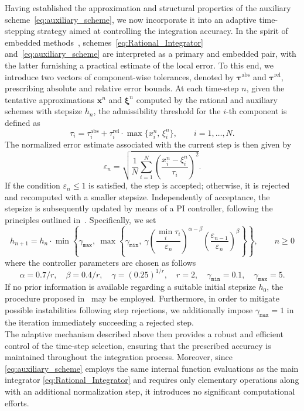 \documentclass[11pt,letterpaper]{article}
\theoremstyle{remark}
\begin{document}
Having established the approximation and structural properties of the auxiliary scheme~\eqref{eq:auxiliary_scheme}, we now incorporate it into an adaptive time-stepping strategy aimed at controlling the integration accuracy. In the spirit of embedded methods~\cite[Section~II.4]{Hairer}, schemes~\eqref{eq:Rational_Integrator} and~\eqref{eq:auxiliary_scheme} are interpreted as a primary and embedded pair, with the latter furnishing a practical estimate of the local error. To this end, we introduce two vectors of component-wise tolerances, denoted by $\bm{\tau}^{\text{abs}}$ and $\bm{\tau}^{\text{rel}}$, prescribing absolute and relative error bounds. At each time-step $n$, given the tentative approximations $\bm{x}^n$ and $\bm{\xi}^n$ computed by the rational and auxiliary schemes with stepsize $h_n$, the admissibility threshold for the $i$-th component is defined as
\begin{equation*}
    \tau_i = \tau_i^{\text{abs}} + \tau_i^{\text{rel}} \cdot \max\{ x_i^n, \, \xi_i^n \}, \qquad i = 1, \dots, N.
\end{equation*}
The normalized error estimate associated with the current step is then given by
\begin{equation*}
    \varepsilon_n = \sqrt{\frac{1}{N} \sum_{i=1}^N \left( \frac{x_i^n - \xi_i^n}{\tau_i} \right)^2 }.
\end{equation*}
If the condition $\varepsilon_n \leq 1$ is satisfied, the step is accepted; otherwise, it is rejected and recomputed with a smaller stepsize. Independently of acceptance, the stepsize is subsequently updated by means of a PI controller, following the principles outlined in~\cite[Section~IV.2]{Hairer_II}. Specifically, we set
\begin{equation}\label{eq:PI_Controller}
    h_{n+1} = h_n \cdot \min\left\{ \gamma_{\texttt{max}}, \ \max\left\{ \gamma_{\texttt{min}}, \ \gamma \left( \frac{\min_i \tau_i}{\varepsilon_n} \right)^{\alpha - \beta} \! \left( \frac{\varepsilon_{n-1}}{\varepsilon_n} \right)^{\beta} \right\} \right\}, \qquad n\geq 0
\end{equation}
where the controller parameters are chosen as follows
\begin{equation*}
    \alpha = 0.7/r, \quad \beta = 0.4/r, \quad \gamma = (0.25)^{1/r}, \quad r = 2, \quad \gamma_{\texttt{min}} = 0.1, \quad \gamma_{\texttt{max}} = 5.
\end{equation*}
If no prior information is available regarding a suitable initial stepsize $h_0$, the procedure proposed in~\cite[p.140]{Hairer} may be employed. Furthermore, in order to mitigate possible instabilities following step rejections, we additionally impose $\gamma_{\texttt{max}} = 1$ in the iteration immediately succeeding a rejected step.  \\ The adaptive mechanism described above then provides a robust and efficient control of the time-step selection, ensuring that the prescribed accuracy is maintained throughout the integration process. Moreover, since \eqref{eq:auxiliary_scheme} employs the same internal function evaluations as the main integrator \eqref{eq:Rational_Integrator} and requires only elementary operations along with an additional normalization step, it introduces no significant computational efforts.
\end{document}
